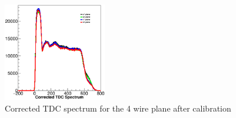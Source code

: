 \begin{figure}
 	\begin{center}
 		\includegraphics[width=0.4\textwidth] {./vdc_plot/vdc_cali2.eps}
 		\caption{ Corrected TDC spectrum for the 4 wire plane after calibration } \label{vdc_p2}
 	\end{center}
\end{figure}   
